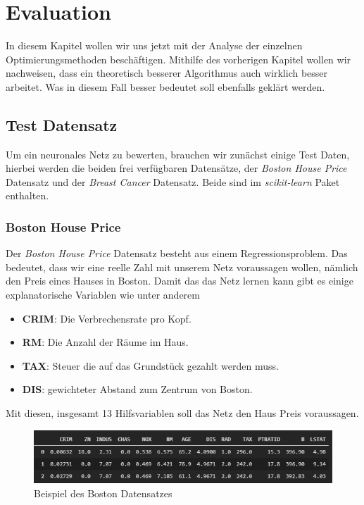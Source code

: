 \section{Evaluation}\label{Evaluation}

In diesem Kapitel wollen wir uns jetzt mit der Analyse der einzelnen 
Optimierungsmethoden beschäftigen. Mithilfe des vorherigen Kapitel wollen
wir nachweisen, dass ein theoretisch besserer Algorithmus auch wirklich besser 
arbeitet. Was in diesem Fall besser bedeutet soll ebenfalls geklärt werden.

\subsection{Test Datensatz} \label{Test Datensatz}

Um ein neuronales Netz zu bewerten, brauchen wir zunächst einige Test Daten,
hierbei werden die beiden frei verfügbaren Datensätze, der \textit{Boston House Price}
Datensatz und der \textit{Breast Cancer} Datensatz. Beide sind im \textit{scikit-learn}
Paket \cite{scikit-learn} enthalten. 

\subsubsection{Boston House Price} \label{Boston House Price}

Der \textit{Boston House Price} Datensatz besteht aus einem Regressionsproblem.
Das bedeutet, dass wir eine reelle Zahl mit unserem Netz voraussagen wollen, nämlich den
Preis eines Hauses in Boston. Damit das das  Netz lernen kann gibt es einige 
explanatorische Variablen wie unter anderem

\begin{itemize}
    \item \textbf{CRIM}: Die Verbrechensrate pro Kopf.
    \item \textbf{RM}: Die Anzahl der Räume im Haus.
    \item \textbf{TAX}: Steuer die auf das Grundstück gezahlt werden muss.
    \item \textbf{DIS}: gewichteter Abstand zum Zentrum von Boston. 
\end{itemize}

Mit diesen, insgesamt 13 Hilfsvariablen soll das Netz den Haus Preis voraussagen.

\begin{figure}[htbp] 
    \centering
       \includegraphics[width=1.0\textwidth]{abb/BostonBeispiel.PNG}
    \caption{Beispiel des Boston Datensatzes}
    \label{fig:BostonBeispiel}
\end{figure}


